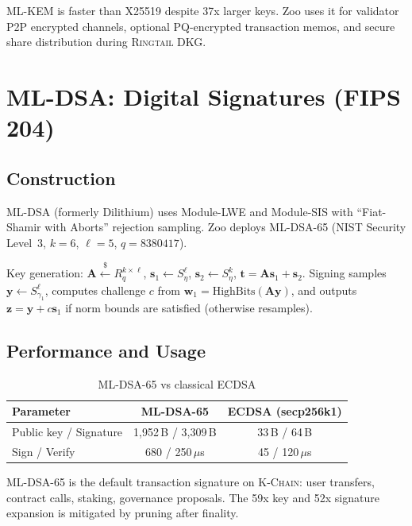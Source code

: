 \documentclass[11pt,letterpaper]{article}
\theoremstyle{definition}
\theoremstyle{remark}
\newcommand{\Ringtail}{\textsc{Ringtail}}
\newcommand{\MLKEM}{\textsc{ML-KEM}}
\newcommand{\MLDSA}{\textsc{ML-DSA}}
\newcommand{\KChain}{\textsc{K-Chain}}
\begin{document}
\MLKEM{} is faster than X25519 despite 37x larger keys. Zoo uses it for validator P2P encrypted channels, optional PQ-encrypted transaction memos, and secure share distribution during \Ringtail{} DKG.

\section{ML-DSA: Digital Signatures (FIPS 204)}

\subsection{Construction}

\MLDSA{} (formerly Dilithium) uses Module-LWE and Module-SIS with ``Fiat-Shamir with Aborts'' rejection sampling. Zoo deploys \MLDSA{}-65 (NIST Security Level~3, $k = 6$, $\ell = 5$, $q = 8380417$).

Key generation: $\mathbf{A} \xleftarrow{\$} R_q^{k \times \ell}$, $\mathbf{s}_1 \leftarrow S_\eta^\ell$, $\mathbf{s}_2 \leftarrow S_\eta^k$, $\mathbf{t} = \mathbf{A}\mathbf{s}_1 + \mathbf{s}_2$. Signing samples $\mathbf{y} \leftarrow S_{\gamma_1}^\ell$, computes challenge $c$ from $\mathbf{w}_1 = \text{HighBits}(\mathbf{A}\mathbf{y})$, and outputs $\mathbf{z} = \mathbf{y} + c\mathbf{s}_1$ if norm bounds are satisfied (otherwise resamples).

\subsection{Performance and Usage}

\begin{table}[h]
\centering
\begin{tabular}{lcc}
\toprule
\textbf{Parameter} & \textbf{ML-DSA-65} & \textbf{ECDSA (secp256k1)} \\
\midrule
Public key / Signature & 1,952\,B / 3,309\,B & 33\,B / 64\,B \\
Sign / Verify & 680 / 250\,$\mu$s & 45 / 120\,$\mu$s \\
\bottomrule
\end{tabular}
\caption{\MLDSA{}-65 vs classical ECDSA}
\label{tab:mldsa-perf}
\end{table}

\MLDSA{}-65 is the default transaction signature on \KChain{}: user transfers, contract calls, staking, governance proposals. The 59x key and 52x signature expansion is mitigated by pruning after finality.
\end{document}
